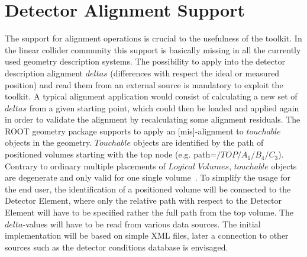 \documentclass[a4paper]{jpconf}
\begin{document}
\section{Detector Alignment Support}
\label{subsect:alignment-support}
\noindent
The support for alignment operations is crucial to the usefulness of the
toolkit. In the linear collider community this support is basically missing 
in all the currently used geometry description systems.
The possibility to apply into the detector description alignment $deltas$ 
(differences with respect the ideal or measured position) and read them 
from an external source is mandatory to exploit the toolkit. A typical 
alignment application would consist of calculating a new set of $deltas$
from a given starting point, which could then be loaded and applied again 
in order to validate the alignment by recalculating some alignment residuals.
The ROOT geometry package supports to apply an [mis]-alignment to 
$touchable$ objects in the geometry. $Touchable$ objects are identified 
by the path of positioned volumes starting with the top node 
(e.g. path=$/TOP/A_1/B_4/C_3$). Contrary to ordinary multiple placements
of $Logical$ $Volumes$, $touchable$ objects are degenerate and only 
valid for one single volume~\cite{bib:ROOT-tgeo}. 
To simplify the usage for the end user,
the identification of a positioned volume will be connected
to the Detector Element, where only the relative path with respect 
to the Detector Element will have to be specified 
rather the full path from the top volume.
The $delta$-values will have to be read from various data sources.
The initial implementation will be based on simple XML files, later
a connection to other sources such as the detector conditions database
is envisaged.

\end{document}
